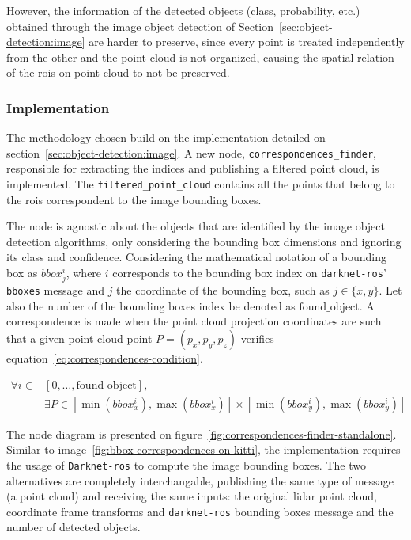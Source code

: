 However, the information of the detected objects (class, probability, etc.) obtained through the image object detection of Section~\ref{sec:object-detection:image} are harder to preserve, since every point is treated independently from the other and the point cloud is not organized, causing the spatial relation of the \acp{roi} on point cloud to not be preserved.


\subsubsection{Implementation}
The methodology chosen build on the implementation detailed on section~\ref{sec:object-detection:image}. A new node, \texttt{correspondences\_finder}, responsible for extracting the indices and  publishing a filtered point cloud, is implemented. The \texttt{filtered\_point\_cloud} contains all the points that belong to the \acp{roi} correspondent to the image bounding boxes. 

The node is agnostic about the objects that are identified by the image object detection algorithms, only considering the bounding box dimensions and ignoring its class and confidence. Considering the mathematical notation of a bounding box as $bbox^i_j$, where $i$ corresponds to the bounding box index on \texttt{darknet-ros}' \texttt{bboxes} message and $j$ the coordinate of the bounding box, such as $j \in \{x, y\}$. Let also the number of the bounding boxes index be denoted as $\text{found\_object}$. A correspondence is made when the point cloud projection coordinates are such that a given point cloud point $P = (p_x, p_y,p_z)$ verifies equation~\ref{eq:correspondences-condition}.

\begin{align}
	\label{eq:correspondences-condition}
	\forall i \in & [0, \ldots, \text{found\_object}], \nonumber \\ 
			& \exists P \in [\min(bbox^i_x), \max(bbox^i_x)] \times[\min(bbox^i_y), \max(bbox^i_y)] 
\end{align}

The node diagram is presented on figure~\ref{fig:correspondences-finder-standalone}. Similar to image~\ref{fig:bbox-correspondences-on-kitti}, the implementation requires the usage of \texttt{Darknet-ros} to compute the image bounding boxes. The two alternatives are completely interchangable, publishing the same type of message (a point cloud) and receiving the same inputs: the original \ac{lidar} point cloud, coordinate frame transforms and \texttt{darknet-ros} bounding boxes message and the number of detected objects.

